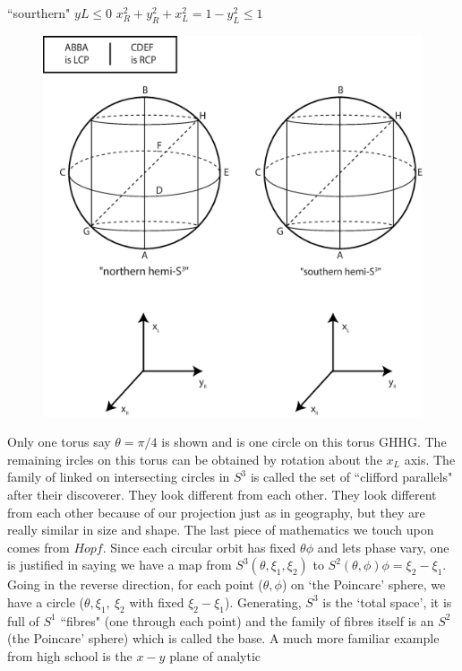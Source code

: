 {} \hspace{1.5cm} ``sourthern" $y L \leq  0$ \quad  $x^2_R + y^2_R + x^2_L = 1 - y^2_L \leq 1$
\begin{figure}[H]
\centering
\includegraphics[scale=0.3]{src/images/chap26/15.eps}
\end{figure}
Only one torus say $\theta  = \pi/4$ is shown and is one circle on this torus GHHG.
The remaining ircles on this torus can be obtained by rotation about the $x_L$ axis.
The family of linked on intersecting circles in $S^3$ is called the set of ``clifford
parallels" after their discoverer. They look different from each other. They
look different from each other because of our projection just as in geography,
but they are really similar in size and shape. The last piece of mathematics
we touch upon comes from $Hopf$. Since each circular orbit has fixed $\theta \phi$ and
lets phase vary, one is justified in saying we have a map from $S^3 (\theta, \xi_1, \xi_2)$ to
$S^2 (\theta, \phi) \phi = \xi_2 - \xi_1$. Going in the reverse direction, for each point ($\theta, \phi$) on
`the Poincare' sphere, we have a circle ($\theta, \xi_1,~ \xi_2$ with fixed $\xi_2 - \xi_1$). Generating, $S^3$ is the `total space', it is full of $S^1$ ``fibres" (one through each point) and the family of fibres itself is an $S^2$ (the Poincare' sphere) which is called the base.
A much more familiar example from high school is the $x - y$ plane of analytic
